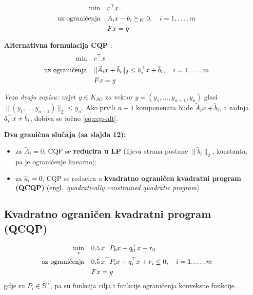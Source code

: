 \begin{definicija}
\begin{equation}
\label{eq:cqp}
\begin{aligned}
\min \quad & c\T x \\
\uzogr & A_ix - b_i \succeq_K 0, \quad i = 1,\dots,m \\
       & Fx = g
\end{aligned}
\end{equation}
\end{definicija}

\textbf{Alternativna formulacija CQP} :
\begin{equation}
\label{eq:cqp-alt}
\begin{aligned}
\min \quad & c\T x \\
\uzogr & \|\tilde A_ix + \tilde b_i\|_2 \le \hat a_i\T x + \hat b_i,
         \quad i = 1,\dots,m \\
       & Fx = g
\end{aligned}
\end{equation}

\emph{Veza dvaju zapisa:} uvjet $y \in K_{SO}$ za vektor
$y = (y_1,\dots,y_{n-1}, y_n)$ glasi $\|(y_1,\dots,y_{n-1})\|_2 \le y_n$.
Ako prvih $n-1$ komponenata bude $\tilde A_ix + \tilde b_i$, a zadnja
$\hat a_i\T x + \hat b_i$, dobiva se točno \eqref{eq:cqp-alt}. \checkmark

\textbf{Dva granična slučaja (sa slajda 12):}
\begin{itemize}
  \item za $\tilde A_i = 0$, CQP se \textbf{reducira u LP}
        (lijeva strana postane $\|\tilde b_i\|_2$, konstanta, pa je
        ograničenje linearno);
  \item za $\hat a_i = 0$, CQP se reducira u \textbf{kvadratno ograničen
        kvadratni program (QCQP)} (engl.\ \emph{quadratically constrained
        quadratic program}).
\end{itemize}

\subsection{Kvadratno ograničen kvadratni program (QCQP)}

\begin{definicija}[QCQP]
\begin{equation}
\begin{aligned}
\min_x \quad & 0{,}5\,x\T P_0x + q_0\T x + r_0 \\
\uzogr & 0{,}5\,x\T P_ix + q_i\T x + r_i \le 0, \quad i = 1,\dots,m \\
       & Fx = g
\end{aligned}
\end{equation}
gdje su $P_i \in \mathbb{S}^n_+$, pa su funkcija cilja i funkcije ograničenja
konveksne funkcije.
\end{definicija}

